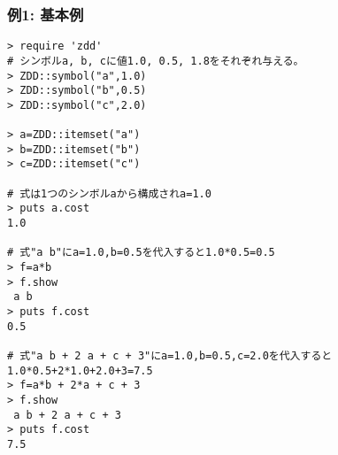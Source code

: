 \subsubsection*{例1: 基本例}



\begin{Verbatim}[baselinestretch=0.7,frame=single]
> require 'zdd'
# シンボルa, b, cに値1.0, 0.5, 1.8をそれぞれ与える。
> ZDD::symbol("a",1.0)
> ZDD::symbol("b",0.5)
> ZDD::symbol("c",2.0)

> a=ZDD::itemset("a")
> b=ZDD::itemset("b")
> c=ZDD::itemset("c")

# 式は1つのシンボルaから構成されa=1.0
> puts a.cost
1.0

# 式"a b"にa=1.0,b=0.5を代入すると1.0*0.5=0.5
> f=a*b
> f.show
 a b
> puts f.cost
0.5

# 式"a b + 2 a + c + 3"にa=1.0,b=0.5,c=2.0を代入すると 1.0*0.5+2*1.0+2.0+3=7.5
> f=a*b + 2*a + c + 3
> f.show
 a b + 2 a + c + 3
> puts f.cost
7.5
\end{Verbatim}
